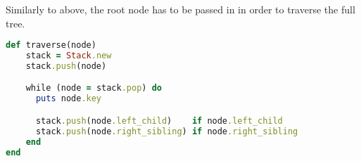 \documentclass[a4paper]{scrartcl}
\begin{document}
Similarly to above, the root node has to be passed in in order to traverse the
full tree.

\begin{lstlisting}[language=ruby]
def traverse(node)
    stack = Stack.new
    stack.push(node)

    while (node = stack.pop) do
      puts node.key

      stack.push(node.left_child)    if node.left_child
      stack.push(node.right_sibling) if node.right_sibling
    end
end
\end{lstlisting}
\end{document}
